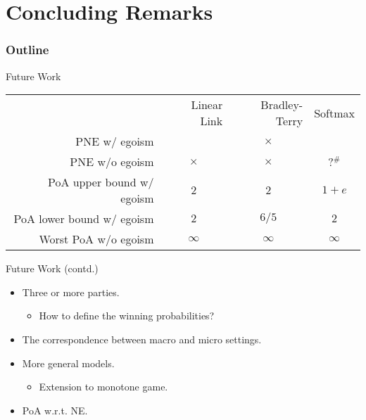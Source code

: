 \documentclass[xcolor=dvipsnames,envcountsect]{beamer}
\begin{document}
\section{Concluding Remarks}

\begin{frame}
\frametitle{Outline}
\end{frame}


\begin{frame}{Future Work}
	\begin{table}[ht]
		\begin{center}
			\begin{tabular}{ r|c|c|c| }
				\multicolumn{1}{r}{}
				&  \multicolumn{1}{r}{Linear Link}
				&  \multicolumn{1}{r}{Bradley-Terry}
				&  \multicolumn{1}{r}{Softmax}\\
				\cline{2-4}
				PNE w/ egoism & \checkmark & $\times$ & \checkmark \\
				PNE w/o egoism & $\times$ & $\times$ & \alert{?$^{\#}$}  \\
				\cline{2-4}
				\hline
				\hline
				PoA upper bound w/ egoism & $2$ & $2$ & \alert{$1+e$} \\
				PoA lower bound w/ egoism & $2$ & \alert{$6/5$} & \alert{$2$} \\
				Worst PoA w/o egoism & $\infty$ & $\infty$ & $\infty$ \\
				\cline{2-4}
			\end{tabular}
		\end{center}
	\end{table}
\end{frame}


\begin{frame}{Future Work (contd.)}
\begin{itemize}
	\item Three or more parties.
		\begin{itemize}
			\item How to define the winning probabilities?
		\end{itemize}
	\vspace{6pt}
	\pause
	\item The correspondence between macro and micro settings.
	\vspace{6pt}
	\pause
	\item More general models.
	\begin{itemize}
		\item Extension to monotone game.
	\end{itemize}
	\vspace{5pt}
	\item PoA w.r.t. NE.
\end{itemize}	
\end{frame}
\end{document}
